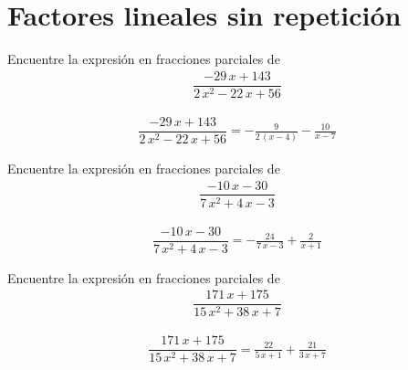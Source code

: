 \section{Factores lineales sin repetición}

{}
\begin{problema}
Encuentre la expresión en fracciones parciales de
\begin{align}
	\dfrac{-29 \, x + 143}{2 \, x^{2} - 22 \, x + 56}
\end{align}
\end{problema}

\begin{align*}
	\dfrac{-29 \, x + 143}{2 \, x^{2} - 22 \, x + 56}= -\frac{9}{2 \, {\left(x - 4\right)}} - \frac{10}{x - 7}
\end{align*}


{}
	\begin{problema}
		Encuentre la expresión en fracciones parciales de
		\begin{align}
			\dfrac{-10 \, x - 30}{7 \, x^{2} + 4 \, x - 3}
		\end{align}
	\end{problema}
	
	\begin{align*}
		\dfrac{-10 \, x - 30}{7 \, x^{2} + 4 \, x - 3}= -\frac{24}{7 \, x - 3} + \frac{2}{x + 1}
	\end{align*}
	

{}
	\begin{problema}
		Encuentre la expresión en fracciones parciales de
		\begin{align}
			\dfrac{171 \, x + 175}{15 \, x^{2} + 38 \, x + 7}
		\end{align}
	\end{problema}
	
	\begin{align*}
		\dfrac{171 \, x + 175}{15 \, x^{2} + 38 \, x + 7}= \frac{22}{5 \, x + 1} + \frac{21}{3 \, x + 7}
	\end{align*}
	

